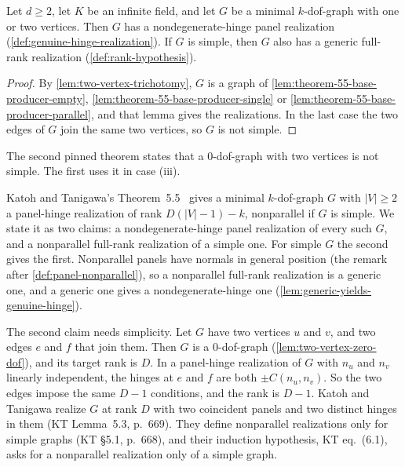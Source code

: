 \begin{lemma}
  \label{lem:theorem-55-base-producer}
  \leanok
  Let $d \ge 2$, let $K$ be an infinite field, and let $G$ be a minimal
  $k$-dof-graph with one or two vertices. Then $G$ has a
  nondegenerate-hinge panel realization
  (\cref{def:genuine-hinge-realization}). If $G$ is simple, then $G$ also
  has a generic full-rank realization (\cref{def:rank-hypothesis}).
\end{lemma}
\begin{proof}
  \leanok
  By \cref{lem:two-vertex-trichotomy}, $G$ is a graph of
  \cref{lem:theorem-55-base-producer-empty},
  \cref{lem:theorem-55-base-producer-single} or
  \cref{lem:theorem-55-base-producer-parallel}, and that lemma gives the
  realizations. In the last case the two edges of $G$ join the same two
  vertices, so $G$ is not simple.
\end{proof}

\begin{fmlnote}
  The second pinned theorem states that a $0$-dof-graph with two
  vertices is not simple. The first uses it in case (iii).
\end{fmlnote}

Katoh and Tanigawa's Theorem~5.5~\cite[p.~670]{katohTanigawa2011} gives
a minimal $k$-dof-graph $G$ with $|V| \ge 2$ a panel-hinge realization
of rank $D(|V| - 1) - k$, nonparallel if $G$ is simple. We state it as
two claims: a nondegenerate-hinge panel realization of every such $G$,
and a nonparallel full-rank realization of a simple one. For simple $G$
the second gives the first. Nonparallel panels have normals in general
position (the remark after \cref{def:panel-nonparallel}), so a
nonparallel full-rank realization is a generic one, and a generic one
gives a nondegenerate-hinge one (\cref{lem:generic-yields-genuine-hinge}).

The second claim needs simplicity. Let $G$ have two vertices $u$ and
$v$, and two edges $e$ and $f$ that join them. Then $G$ is a
$0$-dof-graph (\cref{lem:two-vertex-zero-dof}), and its target rank is
$D$. In a panel-hinge realization of $G$ with $n_u$ and $n_v$ linearly
independent, the hinges at $e$ and $f$ are both $\pm C(n_u, n_v)$. So
the two edges impose the same $D - 1$ conditions, and the rank is
$D - 1$. Katoh and Tanigawa realize $G$ at rank $D$ with two coincident
panels and two distinct hinges in them (KT Lemma~5.3, p.~669). They
define nonparallel realizations only for simple graphs (KT \S5.1,
p.~668), and their induction hypothesis, KT eq.~(6.1), asks for a
nonparallel realization only of a simple graph.

